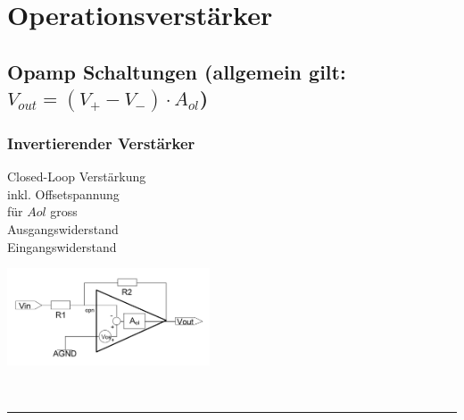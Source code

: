 \newcommand{\titleinfo}{Elektronik 1 - Formelsammlung (gem\"ass Unterricht Guido Keel HS12/13)}
\newcommand{\authorinfo}{A.Waldvogel}
\newcommand{\versioninfo}{powered by \LaTeX}
%
%




\newpage
	\section{Operationsverstärker}
		\subsection{Opamp Schaltungen (allgemein gilt: $V_{out} = (V_+ - V_-)\cdot A_{ol}$)}
		\subsubsection{Invertierender Verstärker}
			\begin{minipage}[T]{13cm}
                Closed-Loop Verst\"arkung
                \hspace{3mm}\\
		        inkl. Offsetspannung
		        \hspace{10.2mm}\\
                f\"ur $A{ol}$ gross
                \hspace{22mm}\\
           	    Ausgangswiderstand    \hspace{10.5mm}\\
            	Eingangswiderstand    \hspace{11mm}
            \end{minipage}
			\begin{minipage}{6cm}
            	\includegraphics[width=6cm]{./bilder/i-verstaerker.png}
            \end{minipage}\\
\hrule

